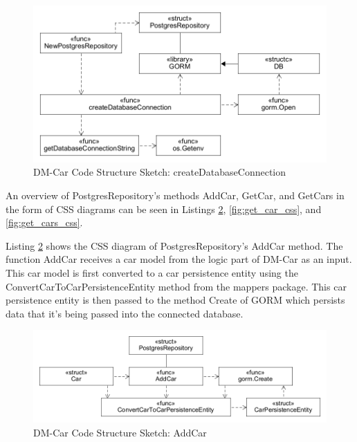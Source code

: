 \begin{figure}[tb]
	\centering
	\includegraphics[width=\textwidth]{figures/8.10_CreateDatabaseConnectionCSS.png}
	\caption{DM-Car Code Structure Sketch: createDatabaseConnection}
	\label{fig:create_db_connection_css}
\end{figure}

An overview of PostgresRepository's methods AddCar, GetCar, and GetCars in the form of CSS diagrams
can be seen in Listings \ref{fig:add_car_css}, \ref{fig:get_car_css}, and \ref{fig:get_cars_css}.

Listing \ref{fig:add_car_css} shows the CSS diagram of PostgresRepository's AddCar method.
The function AddCar receives a car model from the logic part of DM-Car as an input.
This car model is first converted to a car persistence entity using the ConvertCarToCarPersistenceEntity
method from the mappers package.
This car persistence entity is then passed to the method Create of GORM which persists data that it's being passed
into the connected database.

\begin{figure}[tb]
	\centering
	\includegraphics[width=\textwidth]{figures/8.11_AddCarCSS.png}
	\caption{DM-Car Code Structure Sketch: AddCar}
	\label{fig:add_car_css}
\end{figure}

